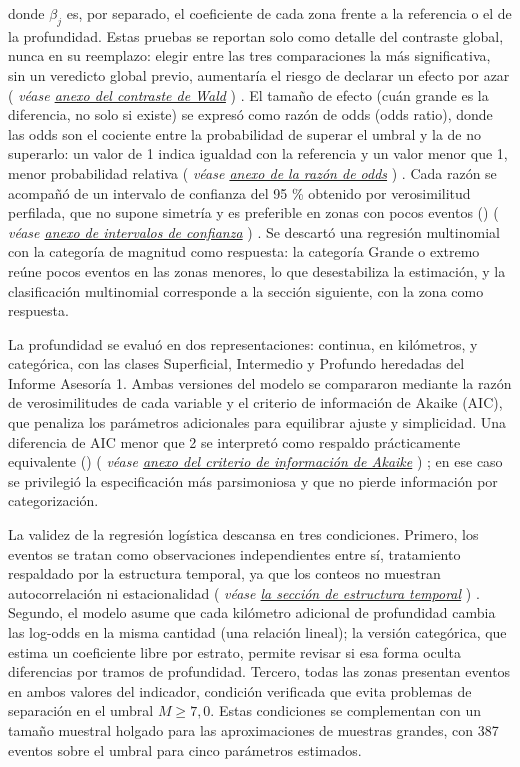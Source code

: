 \documentclass[
  spanish,
  letterpaper,
  DIV=11,
  numbers=noendperiod]{scrartcl}
\newcommand{\asesoriaParenRef}[1]{%
  \textnormal{\textcolor{asesoriaTextColor}{(}}%
  {\hypersetup{linkcolor=asesoriaLinkColor,urlcolor=asesoriaLinkColor,citecolor=asesoriaLinkColor}\textcolor{asesoriaTextColor}{\emph{#1}}}%
  \textnormal{\textcolor{asesoriaTextColor}{)}}%
}
\begin{document}
donde \(\beta_j\) es, por separado, el coeficiente de cada zona frente a
la referencia o el de la profundidad. Estas pruebas se reportan solo
como detalle del contraste global, nunca en su reemplazo: elegir entre
las tres comparaciones la más significativa, sin un veredicto global
previo, aumentaría el riesgo de declarar un efecto por azar
\asesoriaParenRef{véase \hyperref[sec-anexo-wald]{anexo del contraste de Wald}}.
El tamaño de efecto (cuán grande es la diferencia, no solo si existe) se
expresó como razón de odds (odds ratio), donde las odds son el cociente
entre la probabilidad de superar el umbral y la de no superarlo: un
valor de 1 indica igualdad con la referencia y un valor menor que 1,
menor probabilidad relativa
\asesoriaParenRef{véase \hyperref[sec-anexo-or]{anexo de la razón de odds}}.
Cada razón se acompañó de un intervalo de confianza del 95 \% obtenido
por verosimilitud perfilada, que no supone simetría y es preferible en
zonas con pocos eventos ()
\asesoriaParenRef{véase \hyperref[sec-anexo-ic]{anexo de intervalos de confianza}}.
Se descartó una regresión multinomial con la categoría de magnitud como
respuesta: la categoría Grande o extremo reúne pocos eventos en las
zonas menores, lo que desestabiliza la estimación, y la clasificación
multinomial corresponde a la sección siguiente, con la zona como
respuesta.

La profundidad se evaluó en dos representaciones: continua, en
kilómetros, y categórica, con las clases Superficial, Intermedio y
Profundo heredadas del Informe Asesoría 1. Ambas versiones del modelo se
compararon mediante la razón de verosimilitudes de cada variable y el
criterio de información de Akaike (AIC), que penaliza los parámetros
adicionales para equilibrar ajuste y simplicidad. Una diferencia de AIC
menor que 2 se interpretó como respaldo prácticamente equivalente
()
\asesoriaParenRef{véase \hyperref[sec-anexo-aic]{anexo del criterio de información de Akaike}};
en ese caso se privilegió la especificación más parsimoniosa y que no
pierde información por categorización.

La validez de la regresión logística descansa en tres condiciones.
Primero, los eventos se tratan como observaciones independientes entre
sí, tratamiento respaldado por la estructura temporal, ya que los
conteos no muestran autocorrelación ni estacionalidad
\asesoriaParenRef{véase \hyperref[sec-res-temporal]{la sección de estructura temporal}}.
Segundo, el modelo asume que cada kilómetro adicional de profundidad
cambia las log-odds en la misma cantidad (una relación lineal); la
versión categórica, que estima un coeficiente libre por estrato, permite
revisar si esa forma oculta diferencias por tramos de profundidad.
Tercero, todas las zonas presentan eventos en ambos valores del
indicador, condición verificada que evita problemas de separación en el
umbral \(M \geq 7{,}0\). Estas condiciones se complementan con un tamaño
muestral holgado para las aproximaciones de muestras grandes, con 387
eventos sobre el umbral para cinco parámetros estimados.
\end{document}
